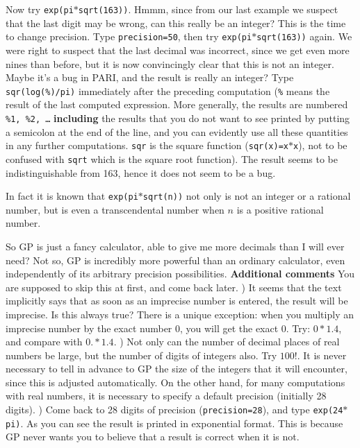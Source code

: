 Now try {\tt exp(pi$*$sqrt(163))}. Hmmm, since from our last example we suspect
that the last digit may be wrong, can this really be an integer?
This is the time to change precision. Type {\tt \bs precision=50},
then try {\tt exp(pi$*$sqrt(163))} again. We were right to suspect that the last
decimal was incorrect, since we get even more nines than before, but it is now
convincingly clear that this is not an integer. Maybe it's a bug in PARI, and
the result is really an integer? Type {\tt sqr(log(\%)/pi)} immediately after
the preceding computation
({\tt \%} means the result of the last computed expression. More generally, the
results are numbered {\tt \%1, \%2, \dots} {\bf including} the results that you
do not want to see printed by putting a semicolon at the end of the line, and
you can evidently use all these quantities in any further computations. {\tt sqr}
is the square function ({\tt sqr(x)=x$*$x}), not to be confused with {\tt sqrt}
which is the square root function). The result seems to be indistinguishable
from 163, hence it does not seem to be a bug.

In fact it is known that {\tt exp(pi$*$sqrt(n))} not only is not an integer
or a rational number, but is even a transcendental number when $n$ is a positive
rational number.

So GP is just a fancy calculator, able to give me more decimals than I will ever
need? Not so, GP is incredibly more powerful than an ordinary calculator, even
independently of its arbitrary precision possibilities.
\medskip
{\bf Additional comments}
\medskip
You are supposed to skip this at first, and come back later.
) It seems that the text implicitly says that as soon as an imprecise number
is entered, the result will be imprecise. Is this always true? There is a unique
exception: when you multiply an imprecise number by the exact number 0, you will
get the exact 0. Try: $0*1.4$, and compare with $0.*1.4$.
) Not only can the number of decimal places of real numbers be large, but the
number of digits of integers also. Try $100!$. It is never necessary to tell
in advance to GP the size of the integers that it will encounter, since this is
adjusted automatically. On the other hand, for many computations with
real numbers, it is necessary to specify a default precision (initially 28 digits).
) Come back to 28 digits of precision ({\tt \bs precision=28}), and type
{\tt exp(24$*$pi)}. As you can see the result is printed in exponential
format. This is because GP never wants you to believe that a result is correct when it is not.

